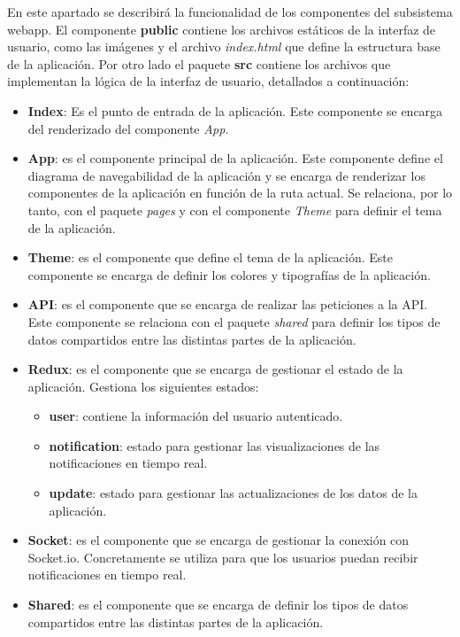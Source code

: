 En este apartado se describirá la funcionalidad de los componentes del subsistema webapp. 
El componente \textbf{public} contiene los archivos estáticos de la interfaz de usuario, como las imágenes y el archivo \textit{index.html} que define la estructura base de la aplicación.
Por otro lado el paquete \textbf{src} contiene los archivos que implementan la lógica de la interfaz de usuario, detallados a continuación:
\begin{itemize}
    \item \textbf{Index}: Es el punto de entrada de la aplicación. Este componente se encarga del renderizado del componente \textit{App}.
    \item \textbf{App}: es el componente principal de la aplicación. Este componente define el diagrama de navegabilidad de la aplicación y se encarga de renderizar los componentes de la aplicación en función de la ruta actual. 
    Se relaciona, por lo tanto, con el paquete \textit{pages} y con el componente \textit{Theme} para definir el tema de la aplicación.
    \item \textbf{Theme}: es el componente que define el tema de la aplicación. Este componente se encarga de definir los colores y tipografías de la aplicación.
    \item \textbf{API}: es el componente que se encarga de realizar las peticiones a la API. Este componente se relaciona con el paquete \textit{shared} para definir los tipos de datos compartidos entre las distintas partes de la aplicación.
    \item \textbf{Redux}: es el componente que se encarga de gestionar el estado de la aplicación. Gestiona los siguientes estados:
    \begin{itemize}
        \item \textbf{user}: contiene la información del usuario autenticado.
        \item \textbf{notification}: estado para gestionar las visualizaciones de las notificaciones en tiempo real.
        \item \textbf{update}: estado para gestionar las actualizaciones de los datos de la aplicación.
    \end{itemize}
    \item \textbf{Socket}: es el componente que se encarga de gestionar la conexión con Socket.io. Concretamente se utiliza para que los usuarios puedan recibir notificaciones en tiempo real.
    \item \textbf{Shared}: es el componente que se encarga de definir los tipos de datos compartidos entre las distintas partes de la aplicación.

\end{itemize}
